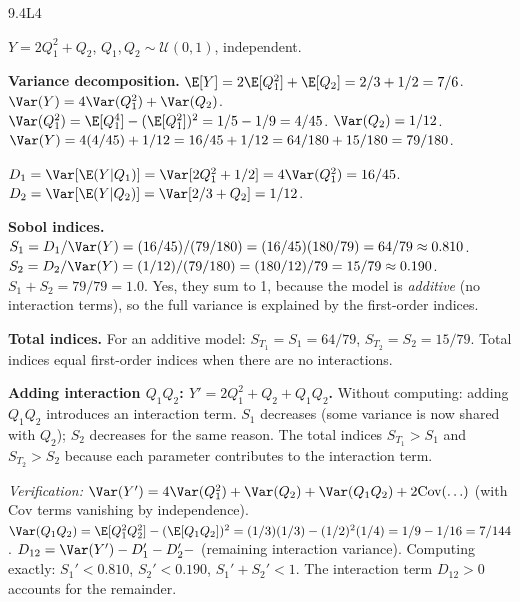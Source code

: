 \begin{solution}{9.4}{L4}

\solanswer

$Y = 2Q_1^2 + Q_2$, $Q_1, Q_2 \sim \mathcal{U}(0,1)$, independent.

 \textbf{Variance decomposition.}
$\E[Y] = 2\E[Q_1^2] + \E[Q_2] = 2/3 + 1/2 = 7/6$.
$\Var(Y) = 4\Var(Q_1^2) + \Var(Q_2)$.
$\Var(Q_1^2) = \E[Q_1^4] - (\E[Q_1^2])^2 = 1/5 - 1/9 = 4/45$.
$\Var(Q_2) = 1/12$.
$\Var(Y) = 4(4/45) + 1/12 = 16/45 + 1/12 = 64/180 + 15/180 = 79/180$.

$D_1 = \Var[\E(Y|Q_1)] = \Var[2Q_1^2 + 1/2] = 4\Var(Q_1^2) = 16/45$.
$D_2 = \Var[\E(Y|Q_2)] = \Var[2/3 + Q_2] = 1/12$.

 \textbf{Sobol indices.}
$S_1 = D_1/\Var(Y) = (16/45)/(79/180) = (16/45)(180/79) = 64/79 \approx 0.810$.
$S_2 = D_2/\Var(Y) = (1/12)/(79/180) = (180/12)/79 = 15/79 \approx 0.190$.
$S_1 + S_2 = 79/79 = 1.0$. Yes, they sum to 1, because the model is
\emph{additive} (no interaction terms), so the full variance is explained
by the first-order indices.

 \textbf{Total indices.}
For an additive model: $S_{T_1} = S_1 = 64/79$, $S_{T_2} = S_2 = 15/79$.
Total indices equal first-order indices when there are no interactions.

 \textbf{Adding interaction $Q_1 Q_2$: $Y' = 2Q_1^2 + Q_2 + Q_1 Q_2$.}
Without computing: adding $Q_1 Q_2$ introduces an interaction term.
$S_1$ decreases (some variance is now shared with $Q_2$); $S_2$ decreases
for the same reason. The total indices $S_{T_1} > S_1$ and $S_{T_2} > S_2$
because each parameter contributes to the interaction term.

\textit{Verification:}
$\Var(Y') = 4\Var(Q_1^2) + \Var(Q_2) + \Var(Q_1 Q_2) + 2\text{Cov}(\ldots)$
(with $\text{Cov}$ terms vanishing by independence).
$\Var(Q_1 Q_2) = \E[Q_1^2 Q_2^2] - (\E[Q_1 Q_2])^2 = (1/3)(1/3) - (1/2)^2(1/4)
= 1/9 - 1/16 = 7/144$.
$D_{12} = \Var(Y') - D_1' - D_2' - $ (remaining interaction variance).
Computing exactly: $S_1' < 0.810$, $S_2' < 0.190$, $S_1' + S_2' < 1$.
The interaction term $D_{12} > 0$ accounts for the remainder.


\end{solution}

